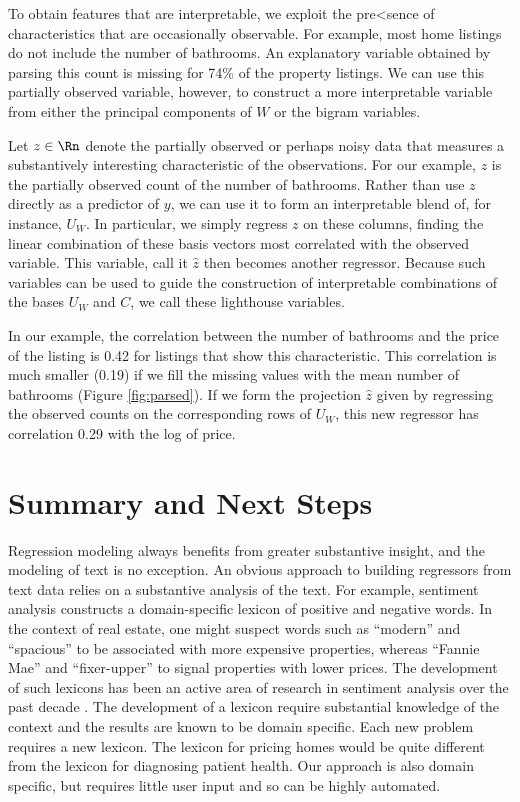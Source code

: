 \documentclass[10pt]{article}
\begin{document}
 To obtain features that are interpretable, we exploit the pre<sence of
 characteristics that are occasionally observable.  For example,
 most home listings do not include the number of bathrooms.  An
 explanatory variable obtained by parsing this count is missing for 74\% of the property listings.  We can use this partially observed variable, however, to construct a more interpretable variable from either the principal components of $W$ or the bigram variables.  


 Let $z \in \Rn$ denote the partially observed or perhaps noisy data
 that measures a substantively interesting characteristic of the
 observations.  For our example, $z$ is the partially observed count of the number of bathrooms.  Rather than use $z$ directly as a predictor of $y$, we
 can use it to form an interpretable blend of, for instance, $U_W$.   In
 particular, we simply regress $z$ on these columns, finding the
 linear combination of these basis vectors most correlated with the
 observed variable.  This variable, call it $\hat{z}$ then becomes
 another regressor.  Because such variables can be used to guide the
 construction of interpretable combinations of the bases $U_W$ and
 $C$, we call these lighthouse variables.  
 
 
 In our example, the correlation between the number of bathrooms and the price of the listing is 0.42 for listings that show this characteristic.  This correlation is much smaller (0.19) if we fill the missing values with the mean number of bathrooms (Figure  \ref{fig:parsed}).  If we form the projection $\hat{z}$ given by regressing the observed counts on the corresponding rows of $U_W$, this new regressor has correlation 0.29 with the log of price.



\section{Summary and Next Steps}
\label{sec:disc}
  
  Regression modeling always benefits from greater substantive insight, and the modeling of text is no exception.  An obvious approach to building regressors from text data relies on a
 substantive analysis of the text.  For example, sentiment analysis constructs a
 domain-specific lexicon of positive and negative words.  In the context of real
 estate, one might suspect  words such as ``modern'' and ``spacious''  to be associated with more expensive properties, whereas
 ``Fannie Mae'' and ``fixer-upper'' to signal properties with lower prices.  The
 development of such lexicons has been an active area of research in sentiment
 analysis over the past decade \citep{taboada11}.  The development of a lexicon
 require substantial knowledge of the context and the results are known to be
 domain specific.  Each new problem requires a new lexicon.  The lexicon for
 pricing homes would be quite different from the lexicon for diagnosing patient
 health.  Our approach is also domain specific, but requires little user input
 and so can be highly automated.
\end{document}
